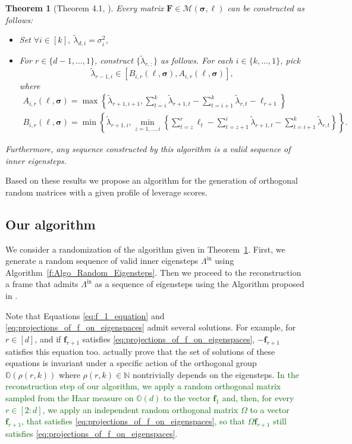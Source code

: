 \documentclass[twoside,11pt]{book}
\newcommand{\rev}[1]{\textcolor{darkgreen}{#1}}
\newtheorem{theorem}{Theorem}
\numberwithin{theorem}{chapter}
\numberwithin{definition}{chapter}
\numberwithin{proposition}{chapter}
\numberwithin{corollary}{chapter}
\numberwithin{example}{chapter}
\numberwithin{lemma}{chapter}
\begin{document}
\begin{theorem}[Theorem 4.1, \citealp{FMPS13}]\label{thm:parametrization_of_polytope}
Every matrix $\bm{F}\in\mathcal{M}({\bm{\sigma},\bm{\ell}})$ can be constructed as follows:
\begin{itemize}
    \item Set $\forall i \in [k], \: \tilde\lambda_{d,i} = \sigma_{i}^2$,
    \item For $r \in \{d-1, \dots, 1 \}$, construct $\{\tilde\lambda_{r,:}\}$ as follows. For each $i \in \{k, \dots , 1\}$, pick $$\tilde\lambda_{r-1,i} \in [B_{i,r}(\bm{\ell},\bm{\sigma}),A_{i,r}(\bm{\ell},\bm{\sigma})],$$ where
    \begin{equation}
    \begin{split}
      A_{i,r}(\bm{\ell},\bm{\sigma}) = \max \left\{\tilde\lambda_{r+1,i+1}, \sum\limits_{t = i}^{k}\tilde\lambda_{r+1,t} - \sum\limits_{t = i+1}^{k}\tilde\lambda_{r,t} - \ell_{r+1} \right\}\\
      B_{i,r}(\bm{\ell},\bm{\sigma}) = \min \left\{\tilde\lambda_{r+1,i}, \min\limits_{z = 1,\dots,i} \left\{\sum\limits_{t=z}^{r}\ell_{t} - \sum\limits_{t=z+1}^{i}\tilde\lambda_{r+1,t} - \sum\limits_{t=i+1}^{k}\tilde\lambda_{r,t}\right\} \right\}.
    \end{split}
    \end{equation}
  \end{itemize}
Furthermore, any sequence constructed by this algorithm is a valid sequence of inner eigensteps.
\end{theorem}

Based on these results we propose an algorithm for the generation of orthogonal random matrices with a given profile of leverage scores.

\subsection{Our algorithm}
We consider a randomization of the algorithm given in Theorem~\ref{thm:parametrization_of_polytope}.
First, we generate a random sequence of valid inner eigensteps $\Lambda^{\text{in}}$ using Algorithm~\ref{f:Algo_Random_Eigensteps}. Then we proceed to the reconstruction a frame that admits $\Lambda^{\text{in}}$ as a sequence of eigensteps using the Algorithm proposed in \citep{FiMiPo11}.

Note that Equations \eqref{eq:f_1_equation} and \eqref{eq:projections_of_f_on_eigenspaces} admit several solutions. For example, for $r \in [d]$, and if $\bm{f}_{r+1}$ satisfies \eqref{eq:projections_of_f_on_eigenspaces}, $-\bm{f}_{r+1}$ satisfies this equation too. \cite{FiMiPo11} actually prove that the set of solutions of these equations is invariant under a specific action of the orthogonal group $\mathbb{O}(\rho(r,k))$ where $\rho(r,k) \in \mathbb{N}$ nontrivially depends on the eigensteps. \rev{In the reconstruction step of our algorithm, we apply a random orthogonal matrix sampled from the Haar measure on $\mathbb{O}(d)$ to the vector $\bm{f}_{1}$ and, then, for every $r \in [2:d]$, we apply an independent random orthogonal matrix $\Omega$ to a vector $\bm{f}_{r+1}$, that satisfies \eqref{eq:projections_of_f_on_eigenspaces}, so that $\Omega \bm{f}_{r+1}$ still satisfies \eqref{eq:projections_of_f_on_eigenspaces}.}
\end{document}
